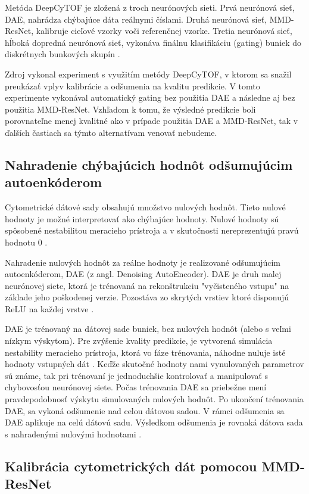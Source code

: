 Metóda DeepCyTOF je zložená z troch neurónových sieti. Prvá neurónová sieť, DAE, nahrádza chýbajúce dáta reálnymi číslami. Druhá neurónová sieť, MMD-ResNet, kalibruje cieľové vzorky voči referenčnej vzorke. Tretia neurónová sieť, hĺboká dopredná neurónová sieť, vykonáva finálnu klasifikáciu (gating) buniek do diskrétnych bunkových skupín \cite{Li2017}. 

Zdroj \cite{Li2017} vykonal experiment s využitím metódy DeepCyTOF, v ktorom sa snažil preukázať vplyv kalibrácie a odšumenia na kvalitu predikcie. V tomto experimente vykonával automatický gating bez použitia DAE a následne aj bez použitia MMD-ResNet. Vzhľadom k tomu, že výsledné predikcie boli porovnateľne menej kvalitné ako v prípade použitia DAE a MMD-ResNet, tak v ďalších častiach sa týmto alternatívam venovať nebudeme.

\subsection{Nahradenie chýbajúcich hodnôt odšumujúcim autoenkóderom}

Cytometrické dátové sady obsahujú množstvo nulových hodnôt. Tieto nulové hodnoty je možné interpretovať ako chýbajúce hodnoty. Nulové hodnoty sú spôsobené nestabilitou meracieho prístroja a v skutočnosti nereprezentujú pravú hodnotu 0 \cite{Li2017}.

Nahradenie nulových hodnôt za reálne hodnoty je realizované odšumujúcim autoenkóderom, DAE (z angl. Denoising AutoEncoder). DAE je druh malej neurónovej siete, ktorá je trénovaná na rekonštrukciu "vyčisteného vstupu" na základe jeho poškodenej verzie. Pozostáva zo skrytých vrstiev ktoré disponujú ReLU na každej vrstve \cite{Li2017}.

DAE je trénovaný na dátovej sade buniek, bez nulových hodnôt (alebo s veľmi nízkym výskytom). Pre zvýšenie kvality predikcie, je vytvorená simulácia nestability meracieho prístroja, ktorá vo fáze trénovania, náhodne nuluje isté hodnoty vstupných dát \cite{Li2017}. Keďže skutočné hodnoty nami vynulovaných parametrov sú známe, tak pri trénovaní je jednoduchšie kontrolovať a manipulovať s chybovosťou neurónovej siete. Počas trénovania DAE sa priebežne mení pravdepodobnosť výskytu simulovaných nulových hodnôt. Po ukončení trénovania DAE, sa vykoná odšumenie nad celou dátovou sadou. V rámci odšumenia sa DAE aplikuje na celú dátovú sadu. Výsledkom odšumenia je rovnaká dátova sada s nahradenými nulovými hodnotami \cite{Li2017}.

\subsection{Kalibrácia cytometrických dát pomocou MMD-ResNet}

